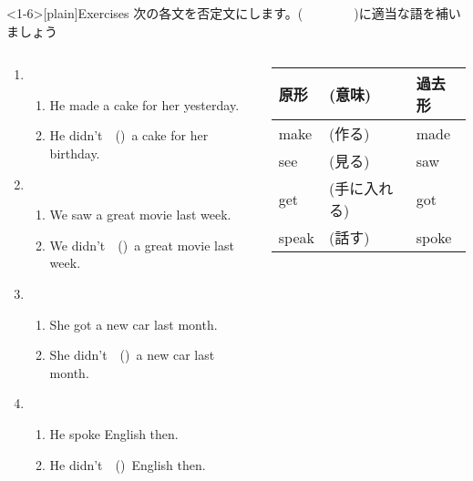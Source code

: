 \documentclass[aspectratio=169,xcolor={dvipsnames,table}]{beamer}
\newcommand{\myaudio}[1]{\href{#1}{\faVolumeUp}}
\begin{document}
\begin{frame}<1-6>[plain]{Exercises}
 次の各文を否定文にします。(~~~~~~~~)に適当な語を補いましょう

\begin{columns}
\begin{column}{.6\textwidth}
\begin{enumerate}
 \item \begin{enumerate}
	\item He made a cake for her yesterday.
	\item He didn't~~()\,\,\,a cake for her birthday.
       \end{enumerate}
 \item \begin{enumerate}
	\item We saw a great movie last week.
	\item We didn't~~()\,\,\,a great movie last week.
       \end{enumerate}
 \item \begin{enumerate}
	\item She got a new car last month.
	\item She didn't~~()\,\,\,a new car last month.
       \end{enumerate}
 \item \begin{enumerate}
	\item He spoke English then.
	\item He didn't~~()\,\,\,English then.
       \end{enumerate}
\end{enumerate}
\end{column}
\begin{column}{.35\textwidth}
{
\begin{tabular}{lll}\toprule
{\small 原形}&{\small (意味)}&{\small 過去形}\\\midrule
{make}&{{\small (作る)}}&{made}\\
{see}&{{\small (見る)}}&{saw}\\
{get}&{{\small (手に入れる)}}&{got}\\
{speak}&{{\small(話す)}}&{spoke}\\
\bottomrule
\end{tabular}}%

\end{column}
\end{columns}
\hfill\myaudio{./audio/026_past_didnot_07.mp3}

\end{frame}
\end{document}
